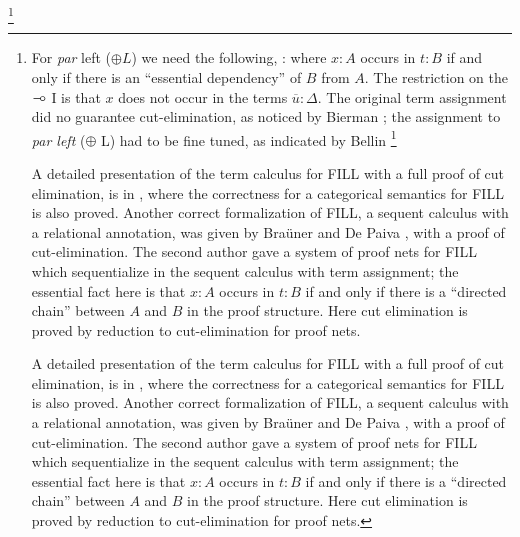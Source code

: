 \footnote{For \emph{par} left ($\oplus L$) we need the following, :
where $x: A$ occurs in $t:B$ if and only if there is an ``essential
dependency'' of $B$ from $A$.  The restriction on the $\mathrel{-\!\circ}$ I is
that $x$ does not occur in the terms $\overline{u}:\Delta$.  The
original term assignment did no guarantee cut-elimination, as noticed
by Bierman \cite{Bierman:1996}; the assignment to \emph{par left}
($\oplus$ L) had to be fine tuned, as indicated by Bellin
\cite{Bellin:1997}
\footnote{For \emph{par} left ($\oplus L$) we need the following:
\[
\AxiomC{$x:A, \overline{x}:\Gamma\vdash \overline{r}: \Delta\qquad y:B, \overline{y}:\Pi\vdash \overline{s}: \Lambda$}
\UnaryInfC{$z: A \oplus B, \overline{x}:\Gamma, \overline{y}:\Pi\vdash  \overline{r'}: \Delta, 
\overline{s'}: \Lambda $}
\DisplayProof
\]
where for $r'_i\in \overline{r'}$ and $s'_j \in \overline{s'}$ we have 
\[
\begin{tabular}{rll}
$r'_i =$ & $\mathtt{let}\ z\ \mathtt{be}\ x-\ \mathtt{in}\ r_i, \qquad$ & if $x$ occurs in $r_i$, \\
             & $r_i$                                                                              & otherwise.\\
$s'_j =$ & $\mathtt{let}\ z\ \mathtt{be}\ -y\ \mathtt{in}\ s_j, \qquad$ & if $y$ occurs in $s_j$, \\
             & $s_j$                                                                              & otherwise.\\
\end{tabular}
\]
We may introduce non-existent dependencies if we define always $r'_i =
\mathtt{let}\ z\ \mathtt{be}\ x-\ \mathtt{in}\ r_i.$
}

A detailed presentation of the term calculus for FILL with a full proof of cut elimination, is in \cite{EadesDePaiva2016}, 
where the correctness for a categorical semantics for FILL is also proved.
Another correct formalization of FILL, a sequent calculus with a relational annotation, was given by Bra\"uner and De Paiva \cite{BraunedDePaiva:1997}, with a proof of cut-elimination.
The second author \cite{Bellin:1997} gave a system of proof nets for FILL which sequentialize in the sequent calculus
with term assignment; the essential fact here is that $x:A$ occurs in $t:B$ if and only if there is a ``directed chain''
between $A$ and $B$ in the proof structure. Here cut elimination is proved by reduction to cut-elimination for proof nets.  

A detailed presentation of the term calculus for FILL with a full
proof of cut elimination, is in \cite{EadesDePaiva2016}, where the
correctness for a categorical semantics for FILL is also proved.
Another correct formalization of FILL, a sequent calculus with a
relational annotation, was given by Bra\"uner and De Paiva
\cite{BraunedDePaiva:1997}, with a proof of cut-elimination.  The
second author \cite{Bellin1997} gave a system of proof nets for FILL
which sequentialize in the sequent calculus with term assignment; the
essential fact here is that $x:A$ occurs in $t:B$ if and only if there
is a ``directed chain'' between $A$ and $B$ in the proof
structure. Here cut elimination is proved by reduction to
cut-elimination for proof nets.


}
